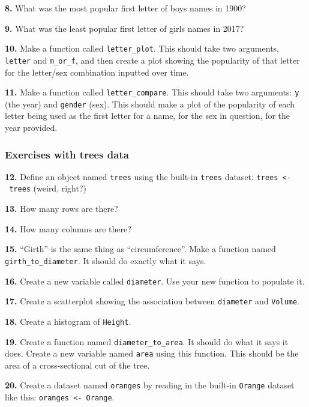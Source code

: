 \documentclass[]{book}
\begin{document}
\textbf{8.} What was the most popular first letter of boys names in 1900?

\textbf{9.} What was the least popular first letter of girls names in 2017?

\textbf{10.} Make a function called \texttt{letter\_plot}. This should take two arguments, \texttt{letter} and \texttt{m\_or\_f}, and then create a plot showing the popularity of that letter for the letter/sex combination inputted over time.

\textbf{11.} Make a function called \texttt{letter\_compare}. This should take two arguments: \texttt{y} (the year) and \texttt{gender} (sex). This should make a plot of the popularity of each letter being used as the first letter for a name, for the sex in question, for the year provided.

\hypertarget{exercises-with-trees-data}{%
\subsubsection*{Exercises with trees data}\label{exercises-with-trees-data}}

\textbf{12.} Define an object named \texttt{trees} using the built-in \texttt{trees} dataset: \texttt{trees\ \textless{}-\ trees} (weird, right?)

\textbf{13.} How many rows are there?

\textbf{14.} How many columns are there?

\textbf{15.} ``Girth'' is the same thing as ``circumference''. Make a function named \texttt{girth\_to\_diameter}. It should do exactly what it says.

\textbf{16.} Create a new variable called \texttt{diameter}. Use your new function to populate it.

\textbf{17.} Create a scatterplot showing the association between \texttt{diameter} and \texttt{Volume}.

\textbf{18.} Create a histogram of \texttt{Height}.

\textbf{19.} Create a function named \texttt{diameter\_to\_area}. It should do what it says it does. Create a new variable named \texttt{area} using this function. This should be the area of a cross-sectional cut of the tree.

\textbf{20.} Create a dataset named \texttt{oranges} by reading in the built-in \texttt{Orange} dataset like this: \texttt{oranges\ \textless{}-\ Orange}.
\end{document}
